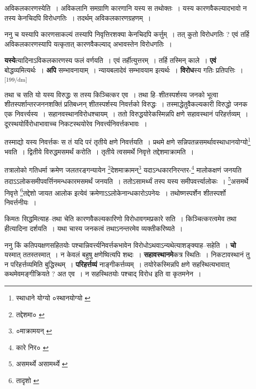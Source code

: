 \documentclass[article,12pt,a4paper]{memoir}
\begin{document}
	  \pstart अविकलकारणस्येति । अविकलानि समग्राणि कारणानि यस्य स तथोक्तः । यस्य कारणवैकल्यादभावो न तस्य केनचिदपि विरोधगतिः । तदर्थम् अविकलकारणग्रहणम् ।
	\pend
       

	  \pstart ननु च यस्यापि कारणसाकल्यं तस्यापि निवृत्तिरशक्या केनचिदपि कर्त्तुम् । तत् कुतो विरोधगतिः ? एवं तर्हि अविकलकारणस्यापि यत्कृतात् कारणवैकल्याद् अभावस्तेन विरोधगतिः ।
	\pend
      

	  \pstart \textbf{यस्ये}त्यादिनाऽविकलकारणस्य फलं वर्णयति । एवं तर्हीत्युत्तरम् । तर्हि तस्मिन् काले । \textbf{एवं} बोद्धव्यमित्यर्थः । \textbf{अपि} सम्भावनायाम् । न्यायबलादेवं सम्भावयाम इत्यर्थः । \textbf{विरोध}स्य गतिः प्रतिपत्तिः ।
	\pend
      \leavevmode\textsuperscript{\rmlatinfont\tiny [199/dm]}

	  \pstart तथा च सति यो यस्य विरुद्धः स तस्य किञ्चित्कर एव । तथा हि--शीतस्पर्शस्य जनको भूत्वा शीतस्पर्शान्तरजननशक्तिं प्रतिबध्नन् शीतस्पर्शस्य निवर्त्तको विरुद्धः । तस्माद्धेतुवैकल्यकारी विरुद्धो जनक एक निवर्त्त्यस्य । सहानवस्थानविरोधश्चायम् । ततो विरुद्धयोरेकस्मिन्नपि क्षणे सहावस्थानं परिहर्त्तव्यम् । दूरस्थयोर्विरोधाभावाच्च निकटस्थयोरेव निवर्त्त्यनिवर्त्तकभावः ।
	\pend
       

	  \pstart तस्माद्यो यस्य निवर्त्तकः स तं यदि परं तृतीये क्षणे निवर्त्तयति । प्रथमे क्षणे सन्निपतन्नसमर्थावस्थाधानयोग्यो\footnote{स्थाधाने योग्यो \cite{dp-msD} ०स्थानयोग्यो \cite{dp-msA} \cite{dp-msB} \cite{dp-edP} \cite{dp-edH} \cite{dp-edE}} भवति । द्वितीये विरुद्धमसमर्थं करोति । तृतीये त्वसमर्थे निवृत्ते तद्देशमाक्रामति ।
	\pend
       

	  \pstart तत्रालोको गतिधर्मा क्रमेण जलतरङ्गन्यायेन \footnote{तद्देशमा० \cite{dp-msC} \cite{dp-msD}}देशमाक्रामन्\footnote{०माक्रामयन् \cite{dp-msB} \cite{dp-edN}} यदाऽन्धकारनिरन्तर-\footnote{कारे निर० \cite{dp-msA} \cite{dp-msB} \cite{dp-edP} \cite{dp-edH} \cite{dp-edE} \cite{dp-edN}} मालोकक्षणं जनयति तदाऽऽलोकसमीपवर्त्तिनमन्धकारमसमर्थं जनयति । ततोऽसामर्थ्यं तस्प यस्य समीपवर्त्त्यालोकः । \footnote{असमर्थ्ये \cite{dp-msA} असामर्थ्ये \cite{dp-edP} \cite{dp-edH} \cite{dp-edE} \cite{dp-edN}}असमर्थे निवृत्ते \footnote{तादृशो \cite{dp-msA} \cite{dp-msB} \cite{dp-edP} \cite{dp-edH} \cite{dp-edN}}तद्देशो जायत आलोक इत्येवं क्रमेणाऽऽलोकेनान्धकारोऽपनेयः । तथोष्णस्पर्शेन शीतस्पर्शो निवर्त्तनीयः ।
	\pend
      

	  \pstart किमतः सिद्धमित्याह--तथा चेति कारणवैकल्यकारिणो विरोधावगमप्रकारे सति । किञ्चित्करत्वमेव तथा हीत्यादिना दर्शयति । यथा चास्य जनकत्वं तथाऽनन्तरमेव व्यक्तीकरिष्यते ।
	\pend
      

	  \pstart ननु किं कतिपयक्षणसहितयोः पश्चान्निवर्त्त्यनिवर्त्तकभावेन विरोधोऽथवाऽन्यथेत्याशङ्क्याह--सहेति । \textbf{चो} यस्मात् ततस्तस्मात् । न केवलं बहुषु क्षणेष्वित्यपि शब्दः । \textbf{सहावस्थानमे}कत्र स्थितिः । निकटावस्थानं तु न परिहर्त्तव्यमिति बुद्धिस्थम् । \textbf{परिहर्त्तव्यं} नाङ्गीकर्त्तव्यम् । तयोरेकस्मिन्नपि क्षणे सहस्थित्यभावात् कथमेवमङ्गीक्रियते ? अत एव । न सहस्थितयोः पश्चाद् विरोध इति वा कृतमनेन ।
	\pend
      
\end{document}
